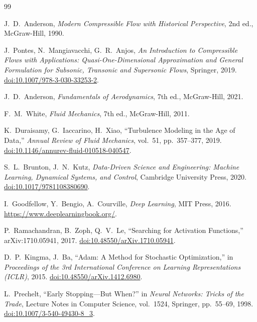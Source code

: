 \documentclass[11pt,a4paper]{report}
\begin{document}
\renewcommand{\bibname}{References}
\begin{thebibliography}{99}

J.~D.~Anderson, \textit{Modern Compressible Flow with Historical Perspective}, 2nd ed., McGraw-Hill, 1990.

J.~Pontes, N.~Mangiavacchi, G.~R.~Anjos, \textit{An Introduction to Compressible Flows with Applications: Quasi-One-Dimensional Approximation and General Formulation for Subsonic, Transonic and Supersonic Flows}, Springer, 2019.
\href{https://doi.org/10.1007/978-3-030-33253-2}{doi:10.1007/978-3-030-33253-2}.

J.~D.~Anderson, \textit{Fundamentals of Aerodynamics}, 7th ed., McGraw-Hill, 2021.

F.~M.~White, \textit{Fluid Mechanics}, 7th ed., McGraw-Hill, 2011.

K.~Duraisamy, G.~Iaccarino, H.~Xiao, ``Turbulence Modeling in the Age of Data,'' \textit{Annual Review of Fluid Mechanics}, vol.~51, pp.~357--377, 2019.
\href{https://doi.org/10.1146/annurev-fluid-010518-040547}{doi:10.1146/annurev-fluid-010518-040547}.

S.~L.~Brunton, J.~N.~Kutz, \textit{Data-Driven Science and Engineering: Machine Learning, Dynamical Systems, and Control}, Cambridge University Press, 2020.
\href{https://doi.org/10.1017/9781108380690}{doi:10.1017/9781108380690}.

I.~Goodfellow, Y.~Bengio, A.~Courville, \textit{Deep Learning}, MIT Press, 2016.
\url{https://www.deeplearningbook.org/}.

P.~Ramachandran, B.~Zoph, Q.~V.~Le, ``Searching for Activation Functions,'' arXiv:1710.05941, 2017.
\href{https://doi.org/10.48550/arXiv.1710.05941}{doi:10.48550/arXiv.1710.05941}.

D.~P.~Kingma, J.~Ba, ``Adam: A Method for Stochastic Optimization,'' in \textit{Proceedings of the 3rd International Conference on Learning Representations (ICLR)}, 2015.
\href{https://doi.org/10.48550/arXiv.1412.6980}{doi:10.48550/arXiv.1412.6980}.

L.~Prechelt, ``Early Stopping---But When?'' in \textit{Neural Networks: Tricks of the Trade}, Lecture Notes in Computer Science, vol.~1524, Springer, pp.~55--69, 1998.
\href{https://doi.org/10.1007/3-540-49430-8_3}{doi:10.1007/3-540-49430-8\_3}.


\end{thebibliography}
\end{document}
